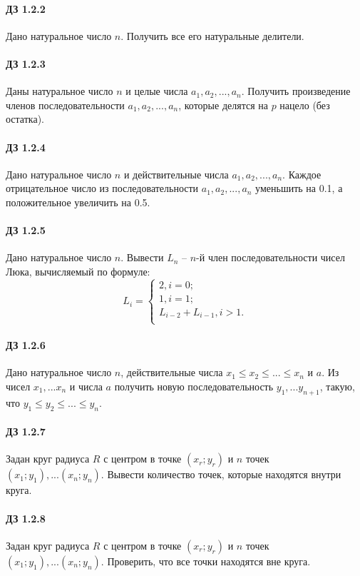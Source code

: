 \documentclass[12pt,a4paper]{report}
\begin{document}
\paragraph*{ДЗ 1.2.2} Дано натуральное число $n$. Получить все его натуральные делители.
\paragraph*{ДЗ 1.2.3} Даны натуральное число $n$ и целые числа $a_1, a_2, ..., a_n$. Получить произведение членов последовательности $a_1, a_2, ..., a_n$, которые делятся на $p$ нацело (без остатка).
\paragraph*{ДЗ 1.2.4} Дано натуральное число $n$ и действительные числа $a_1, a_2, ..., a_n$. Каждое отрицательное число из последовательности $a_1, a_2, ..., a_n$ уменьшить на 0.1, а положительное увеличить на 0.5.
\paragraph*{ДЗ 1.2.5} Дано натуральное число $n$. Вывести $L_n$ -- $n$-й член последовательности чисел Люка, вычисляемый по формуле:
\begin{equation*}
 L_i = 
 \begin{cases}
   2, i = 0; \\
   1, i = 1; \\
   L_{i-2} + L_{i-1}, i > 1. \\
 \end{cases}
\end{equation*}
\paragraph*{ДЗ 1.2.6} Дано натуральное число $n$, действительные числа $x_1 \le x_2 \le ... \le x_n$ и $a$. Из чисел $x_1, ... x_n$ и числа $a$ получить новую последовательность $y_1, ... y_{n+1}$, такую, что $y_1 \le y_2 \le ... \le y_n$.
\paragraph*{ДЗ 1.2.7} Задан круг радиуса $R$ с центром в точке $(x_r; y_r)$ и $n$ точек $(x_1; y_1), ... (x_n; y_n)$. Вывести количество точек, которые находятся внутри круга.
\paragraph*{ДЗ 1.2.8} Задан круг радиуса $R$ с центром в точке $(x_r; y_r)$ и $n$ точек $(x_1; y_1), ... (x_n; y_n)$. Проверить, что все точки находятся вне круга.
\end{document}
